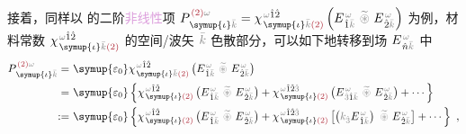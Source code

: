 接着，同样以  的二阶\textcolor{Plum}{非线性}项 $P^{\;\! \textcolor{Maroon}{(2)} \mathcolor{gray}{\omega}}_{\;\! \symup{\iota}\mathcolor{gray}{\bar{k}}} = \chi^{\;\! \mathcolor{gray}{\omega} \hat{1} \hat{2}}_{\;\! \symup{\iota} \mathcolor{gray}{\bar{k}} \textcolor{Maroon}{(2)}} \left( E^{\;\!\mathcolor{gray}{\omega}}_{\;\! \hat{1} \mathcolor{gray}{\bar{k}}} ~\mathcolor{gray}{\widetilde \circledast}~ E^{\;\!\mathcolor{gray}{\omega}}_{\;\! \hat{2} \mathcolor{gray}{\bar{k}}} \right)$ 为例，材料常数 $\chi^{\;\! \mathcolor{gray}{\omega} \hat{1} \hat{2}}_{\;\! \symup{\iota} \mathcolor{gray}{\bar{k}} \textcolor{Maroon}{(2)}}$ 的空间/\textcolor{PineGreen}{波矢} $\mathcolor{gray}{\bar{k}}$ \textcolor{NavyBlue}{色散}部分，可以如下地转移到场 $E^{\;\!\mathcolor{gray}{\omega}}_{\;\! \hat{n} \mathcolor{gray}{\bar{k}}}$ 中
\begin{subequations}
\begin{align}
	P^{\;\! \textcolor{Maroon}{(2)} \mathcolor{gray}{\omega}}_{\;\! \symup{\iota}\mathcolor{gray}{\bar{k}}} =&~ {\symup{\varepsilon_0}} \chi^{\;\! \mathcolor{gray}{\omega} \hat{1} \hat{2}}_{\;\! \symup{\iota} \mathcolor{gray}{\bar{k}} \textcolor{Maroon}{(2)}} \left( E^{\;\!\mathcolor{gray}{\omega}}_{\;\! \hat{1} \mathcolor{gray}{\bar{k}}} ~\mathcolor{gray}{\widetilde \circledast}~ E^{\;\!\mathcolor{gray}{\omega}}_{\;\! \hat{2} \mathcolor{gray}{\bar{k}}} \right) \\ =&~ {\symup{\varepsilon_0}} \left\{ \chi^{\;\! \mathcolor{gray}{\omega} \hat{1} \hat{2}}_{\;\! \symup{\iota} \textcolor{Maroon}{(2)}} \left( E^{\;\!\mathcolor{gray}{\omega}}_{\;\! \hat{1} \mathcolor{gray}{\bar{k}}} ~\mathcolor{gray}{\widetilde \circledast}~ E^{\;\!\mathcolor{gray}{\omega}}_{\;\! \hat{2} \mathcolor{gray}{\bar{k}}} \right) + \chi^{\;\! \mathcolor{gray}{\omega} \hat{1} \hat{2} \mathcolor{gray}{\hat{3}}}_{\;\! \symup{\iota} \textcolor{Maroon}{(2)}} \left( E^{\;\!\mathcolor{gray}{\omega}}_{\;\! \mathcolor{gray}{\hat{3}} \hat{1} \mathcolor{gray}{\bar{k}}} ~\mathcolor{gray}{\widetilde \circledast}~ E^{\;\!\mathcolor{gray}{\omega}}_{\;\! \hat{2} \mathcolor{gray}{\bar{k}}} \right) + \cdots \right\} \label{eq:P(2)_wk}
	\\ :=&~ {\symup{\varepsilon_0}} \left\{ \chi^{\;\! \mathcolor{gray}{\omega} \hat{1} \hat{2}}_{\;\! \symup{\iota} \textcolor{Maroon}{(2)}} \left( E^{\;\!\mathcolor{gray}{\omega}}_{\;\! \hat{1} \mathcolor{gray}{\bar{k}}} ~\mathcolor{gray}{\widetilde \circledast}~ E^{\;\!\mathcolor{gray}{\omega}}_{\;\! \hat{2} \mathcolor{gray}{\bar{k}}} \right) + \chi^{\;\! \mathcolor{gray}{\omega} \hat{1} \hat{2} \mathcolor{gray}{\hat{3}}}_{\;\! \symup{\iota} \textcolor{Maroon}{(2)}} \left[ \left( \mathcolor{gray}{k_{\hat{3}}} E^{\;\!\mathcolor{gray}{\omega}}_{\;\! \hat{1} \mathcolor{gray}{\bar{k}}} \right) ~\mathcolor{gray}{\widetilde \circledast}~ E^{\;\!\mathcolor{gray}{\omega}}_{\;\! \hat{2} \mathcolor{gray}{\bar{k}}} \right] + \cdots \right\}~,
\end{align}
\end{subequations}
